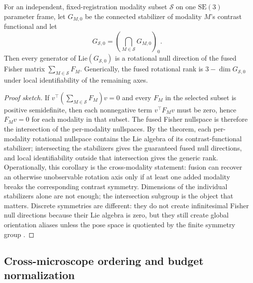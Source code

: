 \begin{corollary}
\label{cor:fusion-symmetry-breaking}
For an independent, fixed-registration modality subset $\mathcal{S}$ on one $\mathrm{SE}(3)$ parameter frame, let $G_{M,0}$ be the connected stabilizer of modality $M$'s contrast functional and let
\[
  G_{\mathcal{S},0}=\left(\bigcap_{M\in\mathcal{S}}G_{M,0}\right)_0 .
\]
Then every generator of $\mathrm{Lie}(G_{\mathcal{S},0})$ is a rotational null direction of the fused Fisher matrix $\sum_{M\in\mathcal{S}}F_M$. Generically, the fused rotational rank is $3-\dim G_{\mathcal{S},0}$ under local identifiability of the remaining axes.
\end{corollary}

\begin{proof}[Proof sketch]
If $v^\top(\sum_{M\in\mathcal{S}}F_M)v=0$ and every $F_M$ in the selected subset is positive semidefinite, then each nonnegative term $v^\top F_M v$ must be zero, hence $F_M v=0$ for each modality in that subset. The fused Fisher nullspace is therefore the intersection of the per-modality nullspaces. By the theorem, each per-modality rotational nullspace contains the Lie algebra of its contrast-functional stabilizer; intersecting the stabilizers gives the guaranteed fused null directions, and local identifiability outside that intersection gives the generic rank. Operationally, this corollary is the cross-modality statement: fusion can recover an otherwise unobservable rotation axis only if at least one added modality breaks the corresponding contrast symmetry. Dimensions of the individual stabilizers alone are not enough; the intersection subgroup is the object that matters. Discrete symmetries are different: they do not create infinitesimal Fisher null directions because their Lie algebra is zero, but they still create global orientation aliases unless the pose space is quotiented by the finite symmetry group \cite{ambiguous-rotations}.
\end{proof}

\subsection{Cross-microscope ordering and budget normalization}

